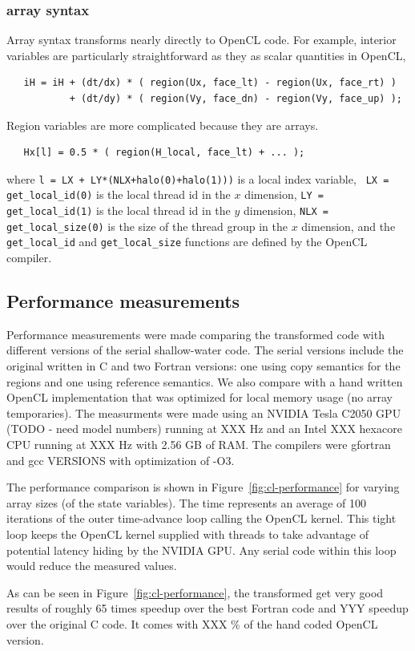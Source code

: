 \subsubsection{array syntax}

Array syntax transforms nearly directly to OpenCL code.  For example, interior
variables are particularly straightforward as they as scalar quantities in
OpenCL,
\begin{verbatim}
   iH = iH + (dt/dx) * ( region(Ux, face_lt) - region(Ux, face_rt) )
           + (dt/dy) * ( region(Vy, face_dn) - region(Vy, face_up) );
\end{verbatim}

Region variables are more complicated because they are arrays.
\begin{verbatim}
   Hx[l] = 0.5 * ( region(H_local, face_lt) + ... );
\end{verbatim}
where {\tt l = LX + LY*(NLX+halo(0)+halo(1)))} is a local index variable, {\tt
  LX = get\_local\_id(0)} is the local thread id in the $x$ dimension, {\tt LY =
  get\_local\_id(1)} is the local thread id in the $y$ dimension, {\tt NLX =
  get\_local\_size(0)} is the size of the thread group in the $x$ dimension, and
the {\tt get\_local\_id} and {\tt get\_local\_size} functions are defined by the
OpenCL compiler.


\subsection{Performance measurements}

Performance measurements were made comparing the transformed code with
different versions of the serial shallow-water code.  The serial versions
include the original written in C and two Fortran versions: one using copy
semantics for the regions and one using reference semantics.  We also compare
with a hand written OpenCL implementation that was optimized for local memory
usage (no array temporaries).  The measurments were made using an NVIDIA Tesla C2050
GPU (TODO - need model numbers) running at XXX Hz and an Intel XXX hexacore CPU
running at XXX Hz with 2.56 GB of RAM.  The compilers were gfortran and gcc VERSIONS with
optimization of -O3.

The performance comparison is shown in Figure~\ref{fig:cl-performance} for
varying array sizes (of the state variables).  The time represents an average
of 100 iterations of the outer time-advance loop calling the OpenCL kernel.
This tight loop keeps the OpenCL kernel supplied with threads to take
advantage of potential latency hiding by the NVIDIA GPU.  Any serial code
within this loop would reduce the measured values.

As can be seen in Figure~\ref{fig:cl-performance}, the transformed get very
good results of roughly 65 times speedup over the best Fortran code and YYY
speedup over the original C code.  It comes with XXX \% of the hand coded
OpenCL version.

